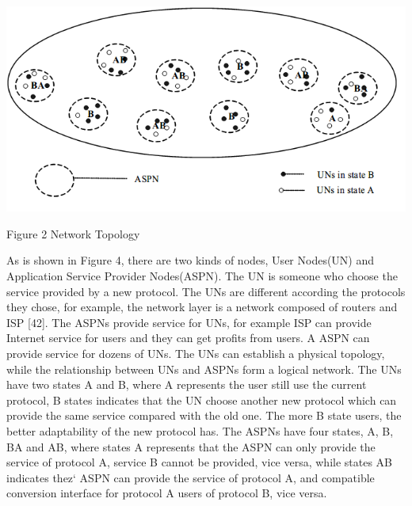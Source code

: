 \documentclass{article}
\begin{document}
\par
\centerline{\includegraphics[width=.5\textwidth]{Figure2.png}}
\centerline{Figure 2 Network Topology}

As is shown in Figure 4, there are two kinds of nodes, User Nodes(UN) and Application Service Provider Nodes(ASPN).
The UN is someone who choose the service provided by a new protocol. The UNs are different according the protocols
they chose, for example, the network layer is a network composed of routers and ISP [42]. The ASPNs provide service
for UNs, for example ISP can provide Internet service for users and they can get profits from users. A ASPN can provide
service for dozens of UNs. The UNs can establish a physical topology, while the relationship between UNs and ASPNs form
a logical network. The UNs have two states A and B, where A represents the user still use the current protocol, B states
indicates that the UN choose another new protocol which can provide the same service compared with the old one. The
more B state users, the better adaptability of the new protocol has. The ASPNs have four states, A, B, BA and AB,
where states A represents that the ASPN can only provide the service of protocol A, service B cannot be provided,
vice versa, while states AB indicates thez` ASPN can provide the service of protocol A, and compatible conversion
interface for protocol A users of protocol B, vice versa.
\end{document}
